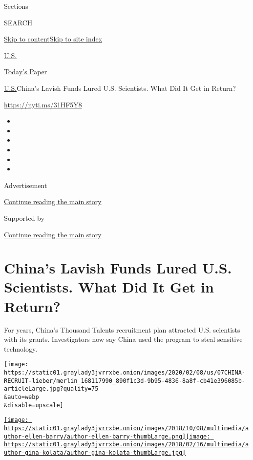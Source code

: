 Sections

SEARCH

\protect\hyperlink{site-content}{Skip to
content}\protect\hyperlink{site-index}{Skip to site index}

\href{https://www.nytimes3xbfgragh.onion/section/us}{U.S.}

\href{https://myaccount.nytimes3xbfgragh.onion/auth/login?response_type=cookie\&client_id=vi}{}

\href{https://www.nytimes3xbfgragh.onion/section/todayspaper}{Today's
Paper}

\href{/section/us}{U.S.}\textbar{}China's Lavish Funds Lured U.S.
Scientists. What Did It Get in Return?

\url{https://nyti.ms/31HF5Y8}

\begin{itemize}
\item
\item
\item
\item
\item
\item
\end{itemize}

Advertisement

\protect\hyperlink{after-top}{Continue reading the main story}

Supported by

\protect\hyperlink{after-sponsor}{Continue reading the main story}

\hypertarget{chinas-lavish-funds-lured-us-scientists-what-did-it-get-in-return}{%
\section{China's Lavish Funds Lured U.S. Scientists. What Did It Get in
Return?}\label{chinas-lavish-funds-lured-us-scientists-what-did-it-get-in-return}}

For years, China's Thousand Talents recruitment plan attracted U.S.
scientists with its grants. Investigators now say China used the program
to steal sensitive technology.

\texttt{[image: https://static01.graylady3jvrrxbe.onion/images/2020/02/08/us/07CHINA-RECRUIT-lieber/merlin\_168117990\_890f1c3d-9b95-4836-8a8f-cb41e396085b-articleLarge.jpg?quality=75\\\&auto=webp\\\&disable=upscale]}

\href{https://www.nytimes3xbfgragh.onion/by/ellen-barry}{\texttt{[image: https://static01.graylady3jvrrxbe.onion/images/2018/10/08/multimedia/author-ellen-barry/author-ellen-barry-thumbLarge.png]}}\href{https://www.nytimes3xbfgragh.onion/by/gina-kolata}{\texttt{[image: https://static01.graylady3jvrrxbe.onion/images/2018/02/16/multimedia/author-gina-kolata/author-gina-kolata-thumbLarge.jpg]}}

